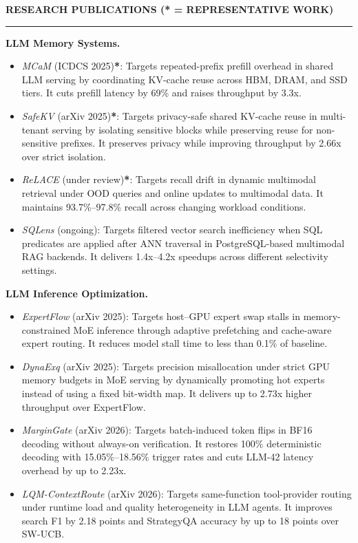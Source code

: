 \documentclass[]{resume}
\renewenvironment{rSection}[1]{%
  \vspace{0.3em}%
  \MakeUppercase{\textbf{#1}}%
  \vspace{0.16em}%
  \hrule
  \vspace{0.22em}%
  \begin{list}{}{%
    \setlength{\leftmargin}{0.85em}%
    \setlength{\rightmargin}{0em}%
    \setlength{\itemsep}{0pt}%
    \setlength{\topsep}{0pt}%
    \setlength{\parsep}{0pt}%
    \setlength{\partopsep}{0pt}%
  }%
  \item[]%
}{%
  \end{list}%
  \vspace{-0.28em}%
}
\begin{document}
\begingroup
\fontsize{9.95pt}{10.55pt}\selectfont
\begin{rSection}{Research Publications \normalfont\small(\textbf{*} = representative work)}
\textbf{LLM Memory Systems.}
\begin{itemize}
    \item \textit{MCaM} (ICDCS 2025)\textbf{*}: Targets repeated-prefix prefill overhead in shared LLM serving by coordinating KV-cache reuse across HBM, DRAM, and SSD tiers. It cuts prefill latency by 69\% and raises throughput by 3.3x.
    \item \textit{SafeKV} (arXiv 2025)\textbf{*}: Targets privacy-safe shared KV-cache reuse in multi-tenant serving by isolating sensitive blocks while preserving reuse for non-sensitive prefixes. It preserves privacy while improving throughput by 2.66x over strict isolation.
    \item \textit{ReLACE} (under review)\textbf{*}: Targets recall drift in dynamic multimodal retrieval under OOD queries and online updates to multimodal data. It maintains 93.7\%--97.8\% recall across changing workload conditions.
    \item \textit{SQLens} (ongoing): Targets filtered vector search inefficiency when SQL predicates are applied after ANN traversal in PostgreSQL-based multimodal RAG backends. It delivers 1.4x--4.2x speedups across different selectivity settings.
\end{itemize}

\textbf{LLM Inference Optimization.}
\begin{itemize}
    \item \textit{ExpertFlow} (arXiv 2025): Targets host--GPU expert swap stalls in memory-constrained MoE inference through adaptive prefetching and cache-aware expert routing. It reduces model stall time to less than 0.1\% of baseline.
    \item \textit{DynaExq} (arXiv 2025): Targets precision misallocation under strict GPU memory budgets in MoE serving by dynamically promoting hot experts instead of using a fixed bit-width map. It delivers up to 2.73x higher throughput over ExpertFlow.
    \item \textit{MarginGate} (arXiv 2026): Targets batch-induced token flips in BF16 decoding without always-on verification. It restores 100\% deterministic decoding with 15.05\%--18.56\% trigger rates and cuts LLM-42 latency overhead by up to 2.23x.
    \item \textit{LQM-ContextRoute} (arXiv 2026): Targets same-function tool-provider routing under runtime load and quality heterogeneity in LLM agents. It improves search F1 by 2.18 points and StrategyQA accuracy by up to 18 points over SW-UCB.
\end{itemize}
\end{rSection}
\endgroup
\end{document}
